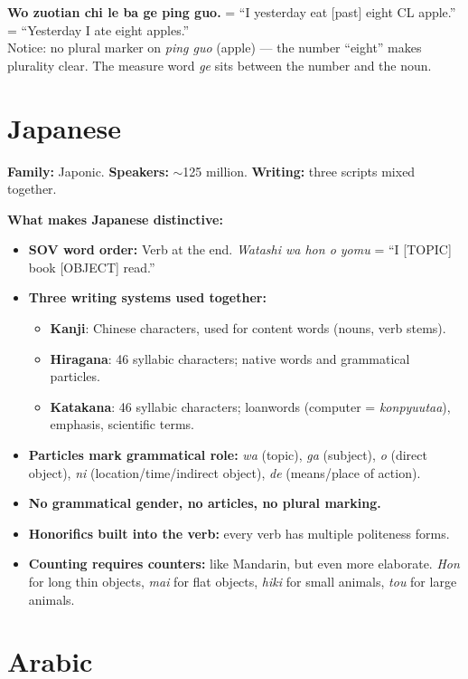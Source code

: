 \documentclass[11pt, letterpaper]{article}
\newcommand{\example}[1]{%
  \begin{tcolorbox}[colback=exbg, colframe=exborder,
    title={\bfseries Example}, arc=3pt, boxrule=1pt]
  #1
  \end{tcolorbox}%
}
\begin{document}
\example{
\textbf{Wo zuotian chi le ba ge ping guo.} = ``I yesterday eat [past] eight CL apple.'' = ``Yesterday I ate eight apples.''\\
Notice: no plural marker on \emph{ping guo} (apple) --- the number ``eight'' makes plurality clear. The measure word \emph{ge} sits between the number and the noun.
}

\section*{Japanese}

\textbf{Family:} Japonic. \textbf{Speakers:} $\sim$125 million. \textbf{Writing:} three scripts mixed together.

\textbf{What makes Japanese distinctive:}
\begin{itemize}[noitemsep]
  \item \textbf{SOV word order:} Verb at the end. \emph{Watashi wa hon o yomu} = ``I [TOPIC] book [OBJECT] read.''
  \item \textbf{Three writing systems used together:}
    \begin{itemize}[noitemsep]
      \item \textbf{Kanji}: Chinese characters, used for content words (nouns, verb stems).
      \item \textbf{Hiragana}: 46 syllabic characters; native words and grammatical particles.
      \item \textbf{Katakana}: 46 syllabic characters; loanwords (computer = \emph{konpyuutaa}), emphasis, scientific terms.
    \end{itemize}
  \item \textbf{Particles mark grammatical role:} \emph{wa} (topic), \emph{ga} (subject), \emph{o} (direct object), \emph{ni} (location/time/indirect object), \emph{de} (means/place of action).
  \item \textbf{No grammatical gender, no articles, no plural marking.}
  \item \textbf{Honorifics built into the verb:} every verb has multiple politeness forms.
  \item \textbf{Counting requires counters:} like Mandarin, but even more elaborate. \emph{Hon} for long thin objects, \emph{mai} for flat objects, \emph{hiki} for small animals, \emph{tou} for large animals.
\end{itemize}

\section*{Arabic}
\end{document}
